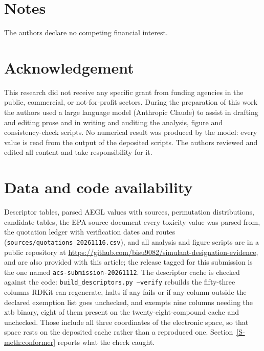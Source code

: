 \documentclass[journal=ancham,manuscript=article,margin=1in]{achemso}
\begin{document}
\section*{Notes}
The authors declare no competing financial interest.

\section*{Acknowledgement}
This research did not receive any specific grant from funding agencies in the
public, commercial, or not-for-profit sectors. During the preparation of this
work the authors used a large language model (Anthropic Claude) to assist in
drafting and editing prose and in writing and auditing the analysis, figure and
consistency-check scripts. No numerical result was produced by the model: every
value is read from the output of the deposited scripts. The authors reviewed and
edited all content and take responsibility for it.

\section*{Data and code availability}
\begingroup\sloppy
Descriptor tables, parsed AEGL values with sources, permutation distributions,
candidate tables, the EPA source document every toxicity value was parsed from,
the quotation ledger with verification dates and routes
(\texttt{sources/quotations\_20261116.csv}), and all analysis and figure
scripts are in a public repository at
\url{https://github.com/bisu9082/simulant-designation-evidence}, and are also
provided with this article; the release tagged for this submission is the one
named \texttt{acs-submission-20261112}.
The descriptor cache is checked against the
code: \texttt{build\_descriptors.py --verify} rebuilds the fifty-three columns
RDKit can regenerate, halts if any fails or if any column outside the declared
exemption list goes unchecked, and exempts nine columns needing the xtb binary,
eight of them present on the twenty-eight-compound cache and unchecked. Those
include all three coordinates of the electronic space, so that space rests on
the deposited cache rather than a reproduced one.
Section~\ref{S-meth:conformer} reports what the check caught.
\endgroup


\end{document}
